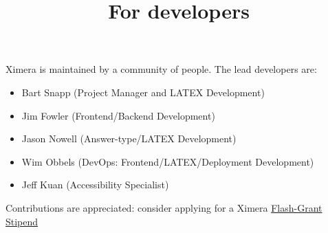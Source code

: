 \documentclass{ximera}
\title{For developers}
\begin{document}
\begin{abstract}
\end{abstract}
\maketitle

Ximera is maintained by a community of people. The lead developers are:

\begin{itemize}
    \item Bart Snapp (Project Manager and LATEX Development)
    \item Jim Fowler (Frontend/Backend Development)
    \item Jason Nowell (Answer-type/LATEX Development)
    \item Wim Obbels (DevOps: Frontend/LATEX/Deployment Development)
    \item Jeff Kuan (Accessibility Specialist)
\end{itemize}

Contributions are appreciated: consider applying for a Ximera \href{https://go.osu.edu/ximera-flash-grant}{Flash-Grant Stipend}
\end{document}
